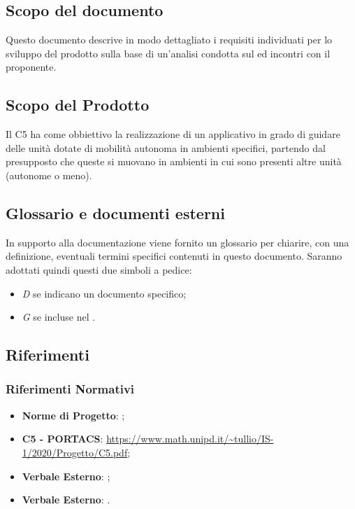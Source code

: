 \subsection{Scopo del documento}
Questo documento descrive in modo dettagliato i requisiti individuati per lo sviluppo del prodotto sulla base di un'analisi condotta sul  ed incontri con il proponente.

\subsection{Scopo del Prodotto}
Il  C5 ha come obbiettivo la realizzazione di un applicativo  in grado di guidare delle unità dotate di mobilità autonoma in ambienti specifici, partendo dal presupposto che queste si muovano in ambienti in cui sono presenti altre unità (autonome o meno).

\subsection{Glossario e documenti esterni}
In supporto alla documentazione viene fornito un glossario per chiarire, con una definizione, eventuali termini specifici contenuti in questo documento.
Saranno adottati quindi questi due simboli a pedice:
\begin{itemize}
    \item \textit{D} se indicano un documento specifico;
    \item \textit{G} se incluse nel .
\end{itemize}

\subsection{Riferimenti}
    \subsubsection{Riferimenti Normativi}
    \begin{itemize}
        \item \textbf{Norme di Progetto}: ;
        \item \textbf{{ C5 - PORTACS}}: \url{https://www.math.unipd.it/~tullio/IS-1/2020/Progetto/C5.pdf};
        \item \textbf{Verbale Esterno}: ;
        \item \textbf{Verbale Esterno}: .
    \end{itemize}
